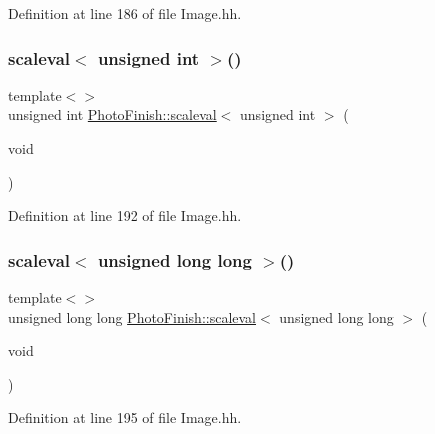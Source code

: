 Definition at line 186 of file Image.\+hh.

\mbox{\label{namespace_photo_finish_a82d48fcde01b1e834f627a2f6ab6befc}} 
\subsubsection{\texorpdfstring{scaleval$<$ unsigned int $>$()}{scaleval< unsigned int >()}}
{\footnotesize\ttfamily template$<$$>$ \\
unsigned int \hyperlink{namespace_photo_finish_a1bfb8180736f3b2786f47361d7586f2c}{Photo\+Finish\+::scaleval}$<$ unsigned int $>$ (\begin{DoxyParamCaption}\item[{void}]{ }\end{DoxyParamCaption})\hspace{0.3cm}{\ttfamily [inline]}}



Definition at line 192 of file Image.\+hh.

\mbox{\label{namespace_photo_finish_aaaa916ac04c95a407348efa5420efd0f}} 
\subsubsection{\texorpdfstring{scaleval$<$ unsigned long long $>$()}{scaleval< unsigned long long >()}}
{\footnotesize\ttfamily template$<$$>$ \\
unsigned long long \hyperlink{namespace_photo_finish_a1bfb8180736f3b2786f47361d7586f2c}{Photo\+Finish\+::scaleval}$<$ unsigned long long $>$ (\begin{DoxyParamCaption}\item[{void}]{ }\end{DoxyParamCaption})\hspace{0.3cm}{\ttfamily [inline]}}



Definition at line 195 of file Image.\+hh.

\mbox{\label{namespace_photo_finish_adbb257b26d8f342162ba6dda2fc32601}} 
